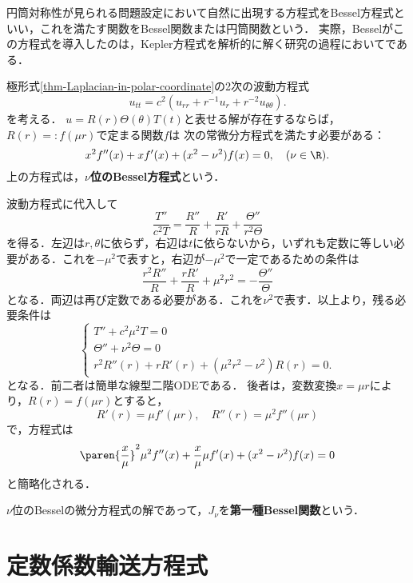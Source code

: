 \documentclass[uplatex,dvipdfmx]{jsreport}
\begin{document}
\begin{tcolorbox}[colframe=ForestGreen, colback=ForestGreen!10!white,breakable,colbacktitle=ForestGreen!40!white,coltitle=black,fonttitle=\bfseries\sffamily,
title=]
    円筒対称性が見られる問題設定において自然に出現する方程式をBessel方程式といい，これを満たす関数をBessel関数または円筒関数という．
    実際，Besselがこの方程式を導入したのは，Kepler方程式を解析的に解く研究の過程においてである．
\end{tcolorbox}

\begin{observation}[分離解の動径方向成分はBessel方程式を満たす]
    極形式\ref{thm-Laplacian-in-polar-coordinate}の2次の波動方程式
    \[u_{tt}=c^2(u_{rr}+r^{-1}u_r+r^{-2}u_{\theta\theta}).\]
    を考える．
    $u=R(r)\Theta(\theta)T(t)$と表せる解が存在するならば，
    $R(r)=:f(\mu r)$で定まる関数$f$は
    次の常微分方程式を満たす必要がある：
    \[x^2f''(x)+xf'(x)+(x^2-\nu^2)f(x)=0,\quad(\nu\in\R).\]
    上の方程式は，\textbf{$\nu$位のBessel方程式}という．
\end{observation}
\begin{Proof}
    波動方程式に代入して
    \[\frac{T''}{c^2T}=\frac{R''}{R}+\frac{R'}{rR}+\frac{\Theta''}{r^2\Theta}\]
    を得る．左辺は$r,\theta$に依らず，右辺は$t$に依らないから，いずれも定数に等しい必要がある．これを$-\mu^2$で表すと，右辺が$-\mu^2$で一定であるための条件は
    \[\frac{r^2R''}{R}+\frac{rR'}{R}+\mu^2r^2=-\frac{\Theta''}{\Theta}\]
    となる．両辺は再び定数である必要がある．これを$\nu^2$で表す．以上より，残る必要条件は
    \[\begin{cases}
        T''+c^2\mu^2T=0\\
        \Theta''+\nu^2\Theta=0\\
        r^2R''(r)+rR'(r)+(\mu^2r^2-\nu^2)R(r)=0.
    \end{cases}\]
    となる．前二者は簡単な線型二階ODEである．
    後者は，変数変換$x=\mu r$により，$R(r)=f(\mu r)$とすると，
    \[R'(r)=\mu f'(\mu r),\quad R''(r)=\mu^2 f''(\mu r)\]
    で，方程式は
    \[\paren{\frac{x}{\mu}}^2\mu^2f''(x)+\frac{x}{\mu}\mu f'(x)+(x^2-\nu^2)f(x)=0\]
    と簡略化される．
\end{Proof}

\begin{definition}
    $\nu$位のBesselの微分方程式の解であって，$J_\nu$を\textbf{第一種Bessel関数}という．
\end{definition}

\section{定数係数輸送方程式}
\end{document}
